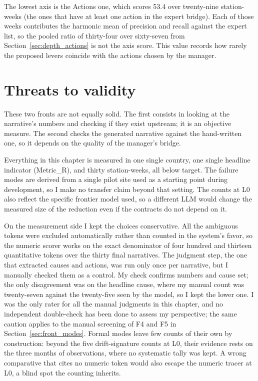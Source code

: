 \documentclass[12pt,a4paper,openright,twoside]{book}
\begin{document}
The lowest axis is the Actions one, which scores 53.4 over twenty-nine station-weeks (the ones that have at least one action in the expert bridge).
Each of those weeks contributes the harmonic mean of precision and recall against the expert list, so the pooled ratio of thirty-four over sixty-seven from Section~\ref{sec:depth_actions} is not the axis score.
This value records how rarely the proposed levers coincide with the actions chosen by the manager.

\section{Threats to validity}
\label{sec:evaluation_close}

These two fronts are not equally solid. 
The first consists in looking at the narrative's numbers and checking if they exist upstream; it is an objective measure. 
The second checks the generated narrative against the hand-written one, so it depends on the quality of the manager's bridge.

Everything in this chapter is measured in one single country, one single headline indicator (Metric\_R), and thirty station-weeks, all below target. 
The failure modes are derived from a single pilot site used as a starting point during development, so I make no transfer claim beyond that setting.
The counts at L0 also reflect the specific frontier model used, so a different \ac{LLM} would change the measured size of the reduction even if the contracts do not depend on it.

On the measurement side I kept the choices conservative.
All the ambiguous tokens were excluded automatically rather than counted in the system's favor, so the numeric scorer works on the exact denominator of four hundred and thirteen quantitative tokens over the thirty final narratives.
The judgment step, the one that extracted causes and actions, was run only once per narrative, but I manually checked them as a control.
My check confirms numbers and cause set; the only disagreement was on the headline cause, where my manual count was twenty-seven against the twenty-five seen by the model, so I kept the lower one.
I was the only rater for all the manual judgments in this chapter, and no independent double-check has been done to assess my perspective; the same caution applies to the manual screening of F4 and F5 in Section~\ref{sec:front_modes}.
Formal modes leave few counts of their own by construction: beyond the five drift-signature counts at L0, their evidence rests on the three months of observations, where no systematic tally was kept.
A wrong comparative that cites no numeric token would also escape the numeric tracer at L0, a blind spot the counting inherits.
\end{document}
